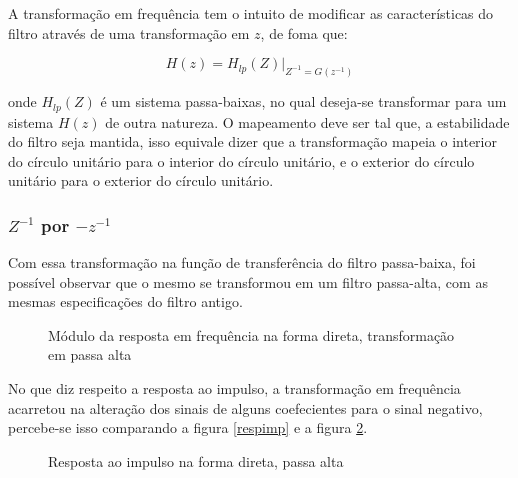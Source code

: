 \documentclass[12pt]{article}
\begin{document}
A transforma\c c\~ao em frequ\^encia tem o intuito de modificar as caracter\'isticas do filtro atrav\'es de uma transforma\c c\~ao em $z$, de foma que:

\[H(z) = H_{lp}(Z)|_{Z^{-1}=G(z^{-1})}\]
 
onde $H_{lp}(Z)$ \'e um sistema passa-baixas, no qual deseja-se transformar para um sistema $H(z)$ de outra natureza. O mapeamento deve ser tal que, a estabilidade do filtro seja mantida, isso equivale dizer que a transforma\c c\~ao mapeia o interior do c\'irculo unit\'ario para o interior do c\'irculo unit\'ario, e o exterior do c\'irculo unit\'ario para o exterior do c\'irculo unit\'ario.

\subsubsection{$Z^{-1}$ por $-z^{-1}$}
\label{subsec411}
Com essa transforma\c c\~ao na fun\c c\~ao de transfer\^encia do filtro passa-baixa, foi poss\'ivel observar que o mesmo se transformou em um filtro passa-alta, com as mesmas especifica\c c\~oes do filtro antigo.

\begin{figure}[H]
\caption{Módulo da resposta em frequ\^encia na forma direta, transforma\c c\~ao em passa alta}
\label{passa_alta}
\end{figure}

No que diz respeito a resposta ao impulso, a transforma\c c\~ao em frequ\^encia acarretou na altera\c c\~ao dos sinais de alguns coefecientes para o sinal negativo, percebe-se isso comparando a figura \ref{respimp} e a figura \ref{passa_alta2}.

\begin{figure}[H]
\caption{Resposta ao impulso na forma direta, passa alta}
\label{passa_alta2}
\end{figure}
\end{document}
